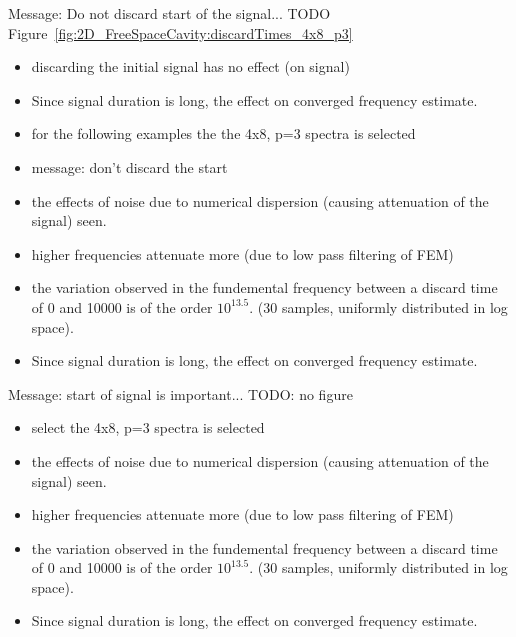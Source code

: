 Message: Do not discard start of the signal...
TODO
Figure~\ref{fig:2D_FreeSpaceCavity:discardTimes_4x8_p3}
\begin{itemize}
\item discarding the initial signal has no effect (on signal)
\item Since signal duration is long, the effect on converged frequency estimate.
\item for the following examples the the 4x8, p=3 spectra is selected
\item message: don't discard the start
\item the effects of noise due to numerical dispersion (causing attenuation of the signal) seen.
\item higher frequencies attenuate more (due to low pass filtering of FEM)
\item the variation observed in the fundemental frequency between a discard time of 0 and 10000 is of the order $10^{13.5}$. (30 samples, uniformly distributed in log space).
\item Since signal duration is long, the effect on converged frequency estimate.
\end{itemize}

Message: start of signal is important...
TODO: no figure
\begin{itemize}
\item select the 4x8, p=3 spectra is selected
\item the effects of noise due to numerical dispersion (causing attenuation of the signal) seen.
\item higher frequencies attenuate more (due to low pass filtering of FEM)
\item the variation observed in the fundemental frequency between a discard time of 0 and 10000 is of the order $10^{13.5}$. (30 samples, uniformly distributed in log space).
\item Since signal duration is long, the effect on converged frequency estimate.
\end{itemize}


\clearpage

